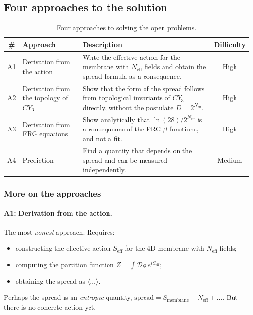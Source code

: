 \documentclass[11pt,a4paper]{article}
\newcommand{\CY}{\ensuremath{CY_3}}
\newcommand{\Neff}{\ensuremath{N_{\text{eff}}}}
\theoremstyle{definition}
\begin{document}
\subsection{Four approaches to the solution}
\label{subsec:open-approaches}

\begin{table}[ht]
\centering
\footnotesize
\caption{Four approaches to solving the open problems.}
\label{tab:four-approaches}
\begin{tabular}{@{}clp{4.5cm}c@{}}
\toprule
\# & Approach & Description & Difficulty \\
\midrule
A1 & Derivation from the action &
     Write the effective action for the membrane with $\Neff$
     fields and obtain the spread formula as a consequence. &
     High \\[0.3em]
A2 & Derivation from the topology of $\CY$ &
     Show that the form of the spread follows from topological
     invariants of $\CY$ directly, without the postulate $D = 2^{\Neff}$. &
     High \\[0.3em]
A3 & Derivation from FRG equations &
     Show analytically that $\ln(28)/2^{\Neff}$
     is a consequence of the FRG $\beta$-functions, and not a fit. &
     High \\[0.3em]
A4 & Prediction &
     Find a quantity that depends on the spread and can be
     measured independently. &
     Medium \\
\bottomrule
\end{tabular}
\end{table}

\subsubsection{More on the approaches}

\paragraph{A1: Derivation from the action.}
The most \emph{honest} approach. Requires:
\begin{itemize}
    \item constructing the effective action $S_{\text{eff}}$ for the
          4D membrane with $N_{\text{eff}}$ fields;
    \item computing the partition function $Z = \int \mathcal{D}\phi
          \, e^{i S_{\text{eff}}}$;
    \item obtaining the spread as $\langle \ldots \rangle$.
\end{itemize}
Perhaps the spread is an \emph{entropic} quantity,
$\text{spread} = S_{\text{membrane}} - N_{\text{eff}} + \ldots$.
But there is no concrete action yet.
\end{document}
